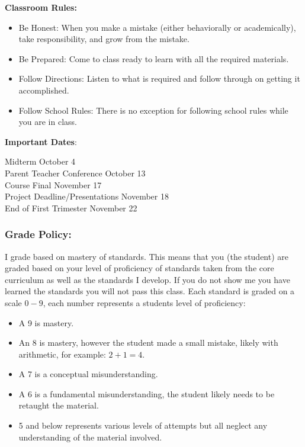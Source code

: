 \documentclass[12pt]{article}
\begin{document}
\begin{multicols}{2}
\noindent\textbf{Classroom Rules:}
\begin{itemize}
\setlength\itemsep{0em}
\item Be Honest:  When you make a mistake (either behaviorally or academically), take responsibility, and grow from the mistake. 

\item Be Prepared: Come to class ready to learn with all the required materials.

\item Follow Directions:  Listen to what is required and follow through on getting it accomplished.

\item Follow School Rules: There is no exception for following school rules while you are in class.

\end{itemize}

\end{multicols}


\noindent\textbf{Important Dates}:
\begin{center} \begin{minipage}{5in}
\begin{flushleft}
Midterm \dotfill October 4\\
Parent Teacher Conference \dotfill October 13 \\
Course Final \dotfill November 17\\
Project Deadline/Presentations \dotfill November 18\\
End of First Trimester \dotfill November 22
\end{flushleft}
\end{minipage}
\end{center}

\subsubsection*{Grade Policy:} I grade based on mastery of standards.  This means that you (the student) are graded based on your level of proficiency of standards taken from the core curriculum as well as the standards I develop.  If you do not show me you have learned the standards you will not pass this class.   Each standard is graded on a scale $0-9$, each number represents a students level of proficiency:
\begin{itemize}
\setlength\itemsep{0em}
\item A 9 is mastery.
\item An 8 is mastery, however the student made a small mistake, likely with arithmetic, for example: $2+1=4$.
\item A 7 is a conceptual misunderstanding.
\item A 6 is a fundamental misunderstanding, the student likely needs to be retaught the material.
\item 5 and below represents various levels of attempts but all neglect any understanding of the material involved.
\end{itemize}
\end{document}
